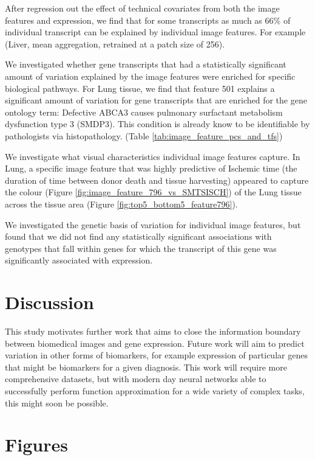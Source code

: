 \documentclass{article}
\begin{document}
After regression out the effect of technical covariates from both the image features and expression, we find that for some transcripts as much as 66\% of individual transcript can be explained by individual image features. For example (Liver, mean aggregation, retrained at a patch size of 256).

We investigated whether gene transcripts that had a statistically significant amount of variation explained by the image features were enriched for specific biological pathways. For Lung tissue, we find that feature 501 explains a significant amount of variation for gene transcripts that are enriched for the gene ontology term: Defective ABCA3 causes pulmonary surfactant metabolism dysfunction type 3 (SMDP3). This condition is already know to be identifiable by pathologists via histopathology. (Table \ref{tab:image_feature_pcs_and_tfs})

We investigate what visual characteristics individual image features capture. In Lung, a specific image feature that was highly predictive of Ischemic time (the duration of time between donor death and tissue harvesting) appeared to capture the colour (Figure \ref{fig:image_feature_796_vs_SMTSISCH}) of the Lung tissue across the tissue area (Figure \ref{fig:top5_bottom5_feature796}).

We investigated the genetic basis of variation for individual image features, but found that we did not find any statistically significant associations with genotypes that fall within genes for which the transcript of this gene was significantly associated with expression.

\section{Discussion}
This study motivates further work that aims to close the information boundary between biomedical images and gene expression. Future work will aim to predict variation in other forms of biomarkers, for example expression of particular genes that might be biomarkers for a given diagnosis. This work will require more comprehensive datasets, but with modern day neural networks able to successfully perform function approximation for a wide variety of complex tasks, this might soon be possible.

\section{Figures}
\end{document}
